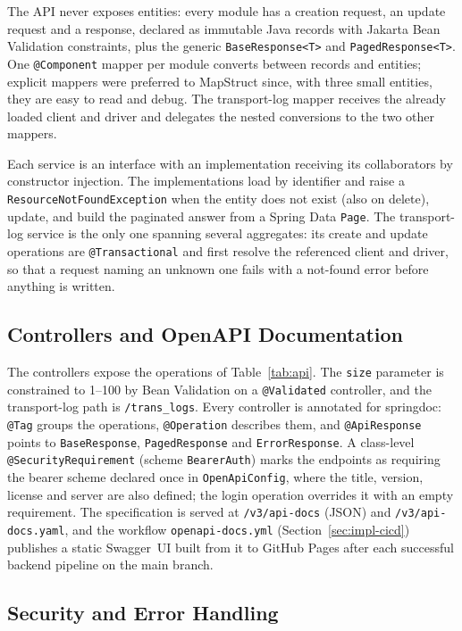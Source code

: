 The API never exposes entities: every module has a creation request, an update request and a response, declared as immutable Java records with Jakarta Bean Validation constraints, plus the generic \texttt{BaseResponse<T>} and \texttt{PagedResponse<T>}. One \texttt{@Component} mapper per module converts between records and entities; explicit mappers were preferred to MapStruct since, with three small entities, they are easy to read and debug. The transport-log mapper receives the already loaded client and driver and delegates the nested conversions to the two other mappers.

Each service is an interface with an implementation receiving its collaborators by constructor injection. The implementations load by identifier and raise a \texttt{ResourceNotFoundException} when the entity does not exist (also on delete), update, and build the paginated answer from a Spring Data \texttt{Page}. The transport-log service is the only one spanning several aggregates: its create and update operations are \texttt{@Transactional} and first resolve the referenced client and driver, so that a request naming an unknown one fails with a not-found error before anything is written.

\subsection{Controllers and OpenAPI Documentation}

The controllers expose the operations of Table~\ref{tab:api}. The \texttt{size} parameter is constrained to 1--100 by Bean Validation on a \texttt{@Validated} controller, and the transport-log path is \texttt{/trans\_logs}. Every controller is annotated for springdoc: \texttt{@Tag} groups the operations, \texttt{@Operation} describes them, and \texttt{@ApiResponse} points to \texttt{BaseResponse}, \texttt{PagedResponse} and \texttt{ErrorResponse}. A class-level \texttt{@SecurityRequirement} (scheme \texttt{BearerAuth}) marks the endpoints as requiring the bearer scheme declared once in \texttt{OpenApiConfig}, where the title, version, license and server are also defined; the login operation overrides it with an empty requirement. The specification is served at \texttt{/v3/api-docs} (JSON) and \texttt{/v3/api-docs.yaml}, and the workflow \texttt{openapi-docs.yml} (Section~\ref{sec:impl-cicd}) publishes a static Swagger~UI built from it to GitHub Pages after each successful backend pipeline on the main branch.

\subsection{Security and Error Handling}
\label{sec:impl-security}

